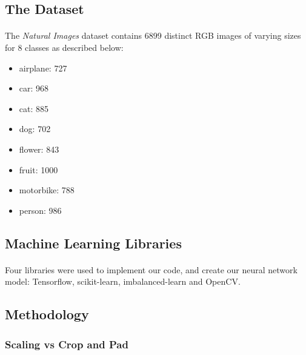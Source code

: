 \documentclass{article}
\begin{document}
\subsection{The Dataset}
\paragraph{}
The {\em Natural Images} dataset contains 6899 distinct RGB images of varying sizes for 8 classes as described below:
\begin{multicols}{2}

\begin{itemize}
	\item airplane: 727 
	\item car: 968
	\item cat: 885
	\item dog: 702
	\item flower: 843
	\item fruit: 1000
	\item motorbike: 788
	\item person: 986
\end{itemize} 

\end{multicols}
\subsection{Machine Learning Libraries}
\paragraph{}
Four libraries were used to implement our code, and create our neural network model: Tensorflow, scikit-learn, imbalanced-learn and OpenCV.

\subsection{Methodology}

\subsubsection{Scaling vs Crop and Pad}
\end{document}
